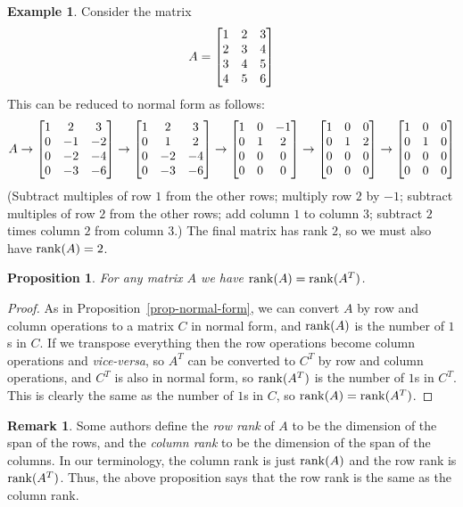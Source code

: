 \documentclass[reqno]{amsart}
\newtheorem{proposition}[theorem]{Proposition}
\theoremstyle{definition}
\newtheorem{remark}[theorem]{Remark}
\newtheorem{example}[theorem]{Example}
\newcommand{\dfn}[1]{\emph{{#1}}\index{#1}}
\begin{document}
\begin{example}\label{eg-normal-form-ii}
 Consider the matrix
 \[ A = \left[\begin{matrix} 1&2&3 \\ 2&3&4 \\ 3&4&5 \\ 4&5&6 \end{matrix}\right] \]
 This can be reduced to normal form as follows:
 \[ A \to
    \left[\begin{matrix} 1&2&3 \\ 0&-1&-2 \\ 0&-2&-4 \\ 0&-3&-6 \end{matrix}\right] 
    \to
    \left[\begin{matrix} 1&2&3 \\ 0&1&2 \\ 0&-2&-4 \\ 0&-3&-6 \end{matrix}\right] 
    \to
    \left[\begin{matrix} 1&0&-1 \\ 0&1&2 \\ 0&0&0 \\ 0&0&0 \end{matrix}\right]
    \to
    \left[\begin{matrix} 1&0&0 \\ 0&1&2 \\ 0&0&0 \\ 0&0&0 \end{matrix}\right]
    \to
    \left[\begin{matrix} 1&0&0 \\ 0&1&0 \\ 0&0&0 \\ 0&0&0 \end{matrix}\right]
 \]
 (Subtract multiples of row $1$ from the other rows; multiply row $2$
 by $-1$; subtract multiples of row $2$ from the other rows; add column
 $1$ to column $3$; subtract $2$ times column $2$ from column $3$.)
 The final matrix has rank $2$, so we must also have $\operatorname{rank}(A)=2$.
\end{example}

\begin{proposition}\label{prop-equal-rank}
 For any matrix $A$ we have $\operatorname{rank}(A)=\operatorname{rank}(A^T)$.
\end{proposition}
\begin{proof}
 As in Proposition~\ref{prop-normal-form}, we can convert $A$ by row
 and column operations to a matrix $C$ in normal form, and $\operatorname{rank}(A)$
 is the number of $1$s in $C$.  If we transpose everything then the
 row operations become column operations and \emph{vice-versa}, so
 $A^T$ can be converted to $C^T$ by row and column operations, and
 $C^T$ is also in normal form, so $\operatorname{rank}(A^T)$ is the number of $1$s in
 $C^T$.  This is clearly the same as the number of $1$s in $C$, so
 $\operatorname{rank}(A)=\operatorname{rank}(A^T)$.  
\end{proof}

\begin{remark}\label{rem-row-col-rank}
 Some authors define the \dfn{row rank} of $A$ to be the dimension of
 the span of the rows, and the \dfn{column rank} to be the dimension
 of the span of the columns.  In our terminology, the column rank is
 just $\operatorname{rank}(A)$ and the row rank is $\operatorname{rank}(A^T)$.  Thus, the above
 proposition says that the row rank is the same as the column rank.
\end{remark}
\end{document}
